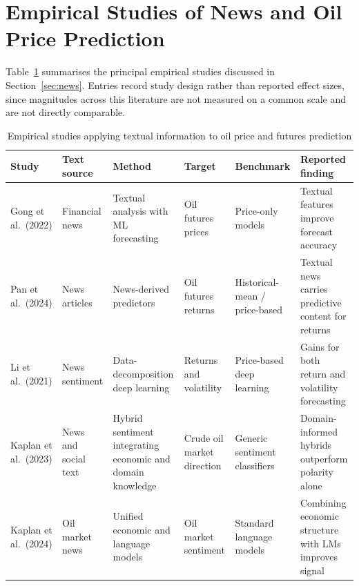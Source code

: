 \documentclass[journal]{IEEEtran}
\begin{document}
\clearpage
\onecolumn
\appendices
\section{Empirical Studies of News and Oil Price Prediction}
\label{app:news_studies}

Table~\ref{tab:news_studies} summarises the principal empirical studies discussed in Section~\ref{sec:news}. Entries record study design rather than reported effect sizes, since magnitudes across this literature are not measured on a common scale and are not directly comparable.

\vspace{0.5em}

\begin{table}[H]
\centering
\caption{Empirical studies applying textual information to oil price and futures prediction}
\label{tab:news_studies}

\small
\setlength{\tabcolsep}{4pt}
\renewcommand{\arraystretch}{1.15}

\begin{tabular}{p{2.6cm} p{2.6cm} p{3.0cm} p{2.6cm} p{2.4cm} p{2.6cm}}
\toprule
\textbf{Study} & \textbf{Text source} & \textbf{Method} & \textbf{Target} & \textbf{Benchmark} & \textbf{Reported finding} \\
\midrule

Gong et al.\ (2022) \cite{Gong2022} & Financial news & Textual analysis with ML forecasting & Oil futures prices & Price-only models & Textual features improve forecast accuracy \\

Pan et al.\ (2024) \cite{Pan2024} & News articles & News-derived predictors & Oil futures returns & Historical-mean / price-based & Textual news carries predictive content for returns \\

Li et al.\ (2021) \cite{Li2021Sentiment} & News sentiment & Data-decomposition deep learning & Returns and volatility & Price-based deep learning & Gains for both return and volatility forecasting \\

Kaplan et al.\ (2023) \cite{Kaplan2023} & News and social text & Hybrid sentiment integrating economic and domain knowledge & Crude oil market direction & Generic sentiment classifiers & Domain-informed hybrids outperform polarity alone \\

Kaplan et al.\ (2024) \cite{Kaplan2024} & Oil market news & Unified economic and language models & Oil market sentiment & Standard language models & Combining economic structure with LMs improves signal \\


\end{tabular}
\end{table}
\end{document}
